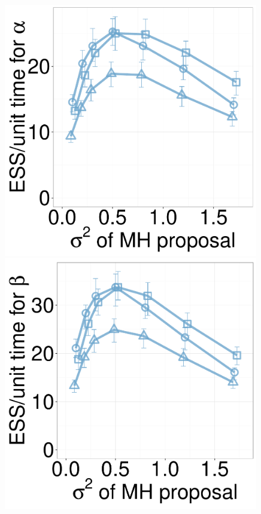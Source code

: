   \begin{figure}[H]
  \centering
  \begin{minipage}[!hp]{0.24\linewidth}
  \centering
    \includegraphics [width=0.99\textwidth, angle=0]{figs/new_whole_exp_figs/mh_exp_alpha_dim3.pdf}
\end{minipage}
  \begin{minipage}[hp]{0.24\linewidth}
  \centering
    \includegraphics [width=0.99\textwidth, angle=0]{figs/new_whole_exp_figs/mh_exp_beta_dim3.pdf}

\end{minipage}
\end{figure}
